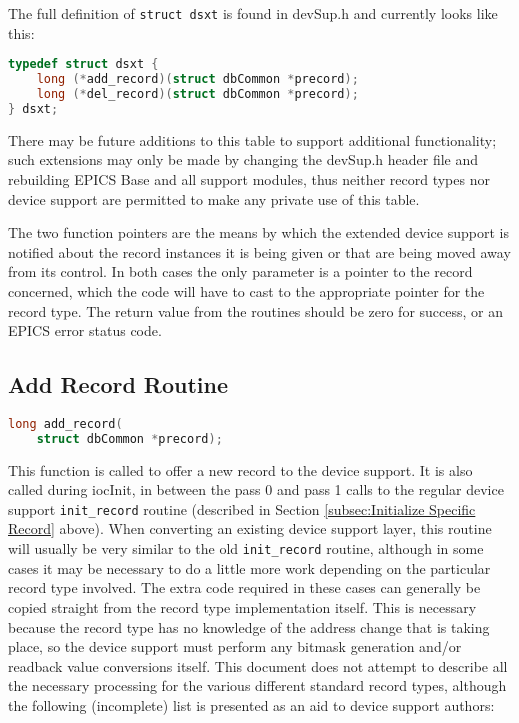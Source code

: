The full definition of \verb|struct dsxt| is found in devSup.h and currently looks like this:

\begin{lstlisting}[language=C]
typedef struct dsxt {
    long (*add_record)(struct dbCommon *precord);
    long (*del_record)(struct dbCommon *precord);
} dsxt;
\end{lstlisting}

There may be future additions to this table to support additional functionality; such extensions may only be made by changing the devSup.h header file and rebuilding EPICS Base and all support modules, thus neither record types nor device support are permitted to make any private use of this table.

The two function pointers are the means by which the extended device support is notified about the record instances it is being given or that are being moved away from its control.
In both cases the only parameter is a pointer to the record concerned, which the code will have to cast to the appropriate pointer for the record type.
The return value from the routines should be zero for success, or an EPICS error status code.

\subsection{Add Record Routine}

\begin{lstlisting}[language=C]
long add_record(
    struct dbCommon *precord);
\end{lstlisting}

This function is called to offer a new record to the device support.
It is also called during iocInit, in between the pass 0 and pass 1 calls to the regular device support \verb|init_record| routine (described in Section \ref{subsec:Initialize Specific Record} above).
When converting an existing device support layer, this routine will usually be very similar to the old \verb|init_record| routine, although in some cases it may be necessary to do a little more work depending on the particular record type involved.
The extra code required in these cases can generally be copied straight from the record type implementation itself.
This is necessary because the record type has no knowledge of the address change that is taking place, so the device support must perform any bitmask generation and/or readback value conversions itself.
This document does not attempt to describe all the necessary processing for the various different standard record types, although the following (incomplete) list is presented as an aid to device support authors:

